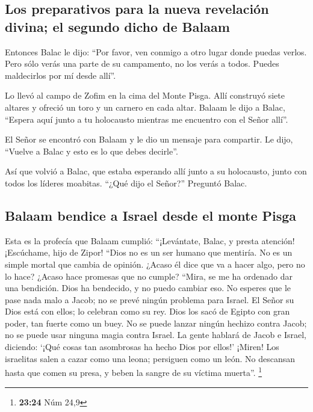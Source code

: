 \hypertarget{los-preparativos-para-la-nueva-revelaciuxf3n-divina-el-segundo-dicho-de-balaam}{%
\subsection{Los preparativos para la nueva revelación divina; el segundo
dicho de
Balaam}\label{los-preparativos-para-la-nueva-revelaciuxf3n-divina-el-segundo-dicho-de-balaam}}

 Entonces Balac le dijo: ``Por favor, ven conmigo a otro
lugar donde puedas verlos. Pero sólo verás una parte de su campamento,
no los verás a todos. Puedes maldecirlos por mí desde allí''.

 Lo llevó al campo de Zofim en la cima del Monte Pisga.
Allí construyó siete altares y ofreció un toro y un carnero en cada
altar.  Balaam le dijo a Balac, ``Espera aquí junto a tu
holocausto mientras me encuentro con el Señor allí''.

 El Señor se encontró con Balaam y le dio un mensaje para
compartir. Le dijo, ``Vuelve a Balac y esto es lo que debes decirle''.

 Así que volvió a Balac, que estaba esperando allí junto
a su holocausto, junto con todos los líderes moabitas. ``¿Qué dijo el
Señor?'' Preguntó Balac.

\hypertarget{balaam-bendice-a-israel-desde-el-monte-pisga}{%
\subsection{Balaam bendice a Israel desde el monte
Pisga}\label{balaam-bendice-a-israel-desde-el-monte-pisga}}

 Esta es la profecía que Balaam cumplió: ``¡Levántate,
Balac, y presta atención! ¡Escúchame, hijo de Zipor! 
``Dios no es un ser humano que mentiría. No es un simple mortal que
cambia de opinión. ¿Acaso él dice que va a hacer algo, pero no lo hace?
¿Acaso hace promesas que no cumple?  ``Mira, se me ha
ordenado dar una bendición. Dios ha bendecido, y no puedo cambiar eso.
 No esperes que le pase nada malo a Jacob; no se prevé
ningún problema para Israel. El Señor su Dios está con ellos; lo
celebran como su rey.  Dios los sacó de Egipto con gran
poder, tan fuerte como un buey.  No se puede lanzar
ningún hechizo contra Jacob; no se puede usar ninguna magia contra
Israel. La gente hablará de Jacob e Israel, diciendo: `¡Qué cosas tan
asombrosas ha hecho Dios por ellos!'  ¡Miren! Los
israelitas salen a cazar como una leona; persiguen como un león. No
descansan hasta que comen su presa, y beben la sangre de su víctima
muerta''. \footnote{\textbf{23:24} Núm 24,9}


